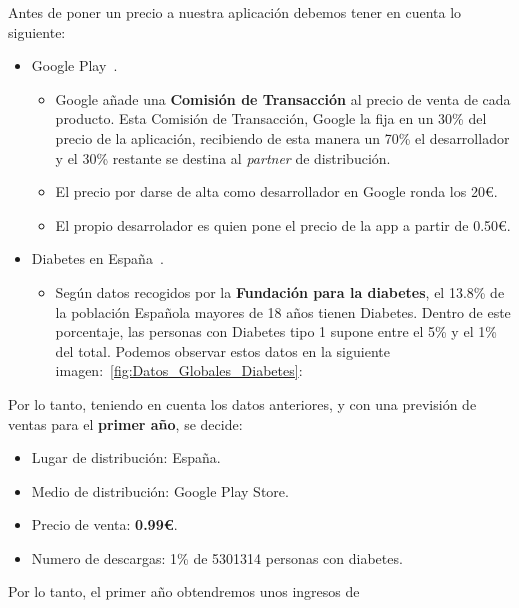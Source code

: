 Antes de poner un precio a nuestra aplicación debemos tener en cuenta lo siguiente:
\begin{itemize}
	\item Google Play~\cite{googleplay}.
		\begin{itemize}
			\item Google añade una \textbf{Comisión de Transacción} al precio de venta de cada producto. Esta Comisión de 				Transacción, Google la fija en un 30\% del precio de la aplicación, recibiendo de esta manera un 70\% el 					desarrollador y el 30\% restante se destina al \textit{partner} de distribución.
			\item El precio por darse de alta como desarrollador en Google ronda los 20\euro{}.
			\item El propio desarrolador es quien pone el precio de la app a partir de 0.50\euro{}.
		\end{itemize}
	\item Diabetes en España~\cite{fundaciondiabetes}.
		\begin{itemize}
			\item Según datos recogidos por la \textbf{Fundación para la diabetes}, el 13.8\% de la población Española mayores de 18 años  tienen Diabetes. Dentro de este porcentaje, las personas con Diabetes tipo 1 supone entre el 5\% y el 1\% del total. 
			Podemos observar estos datos en la siguiente imagen:~\ref{fig:Datos_Globales_Diabetes}:
		\end{itemize}
\end{itemize}
Por lo tanto, teniendo en cuenta los datos anteriores, y con una previsión de ventas para el \textbf{primer año}, se decide:
\begin{itemize}
	\item Lugar de distribución: España.
	\item Medio de distribución: Google Play Store.
	\item Precio de venta: \textbf{0.99\euro{}}.
	\item Numero de descargas: 1\% de 5301314 personas con diabetes.
\end{itemize}
Por lo tanto, el primer año obtendremos unos ingresos de
